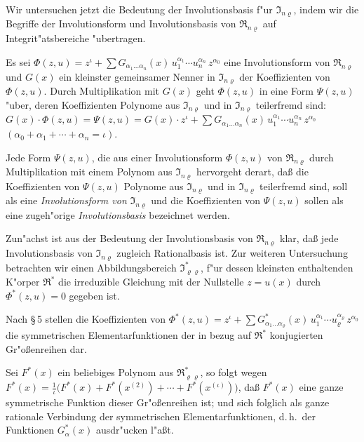 \documentclass[11pt,a4paper]{article}
\begin{document}
Wir untersuchen jetzt die Bedeutung der Involutionsbasis f"{u}r $\mathfrak{I}_{n\varrho}$,
indem wir die Begriffe der Involutionsform und Involutionsbasis von
$\mathfrak{R}_{n\varrho}$ auf Integrit"{a}tsbereiche "{u}bertragen.

Es sei
$\Phi(z,u)=z^{\iota}+\sum G_{\alpha_{1}\dots\alpha_{n}}(x)\,u_{1}^{\alpha_{1}}\cdots u_{n}^{\alpha_{n}}\,z^{\alpha_{0}}$
eine Involutionsform von $\mathfrak{R}_{n\varrho}$ und $G(x)$ ein kleinster gemeinsamer Nenner
in $\mathfrak{I}_{n\varrho}$ der Koeffizienten von $\Phi(z,u)$. Durch Multiplikation mit $G(x)$ geht
$\Phi(z,u)$ in eine Form $\Psi(z,u)$ "{u}ber, deren Koeffizienten Polynome aus
$\mathfrak{I}_{n\varrho}$ und in $\mathfrak{I}_{n\varrho}$ teilerfremd sind:
$G(x)\cdot\Phi(z,u)=\Psi(z,u)=G(x)\cdot z^{\iota}+\sum G_{\alpha_{1}\dots\alpha_{n}}(x)\,u_{1}^{\alpha_{1}}\cdots u_{n}^{\alpha_{n}}\,z^{\alpha_{0}}$
$(\alpha_{0}+\alpha_{1}+\cdots+\alpha_{n}=\iota)$.

Jede Form $\Psi(z,u)$, die aus einer Involutionsform $\Phi(z,u)$ von $\mathfrak{R}_{n\varrho}$
durch Multiplikation mit einem Polynom aus $\mathfrak{I}_{n\varrho}$ hervorgeht derart, da\ss{}
die Koeffizienten von $\Psi(z,u)$ Polynome aus $\mathfrak{I}_{n\varrho}$ und in $\mathfrak{I}_{n\varrho}$ teilerfremd sind,
soll als eine \emph{Involutionsform von} $\mathfrak{I}_{n\varrho}$ und die Koeffizienten von $\Psi(z,u)$
sollen als eine zugeh"{o}rige \emph{Involutionsbasis} bezeichnet werden.

Zun"{a}chst ist aus der Bedeutung der Involutionsbasis von $\mathfrak{R}_{n\varrho}$ klar,
da\ss{} jede Involutionsbasis von $\mathfrak{I}_{n\varrho}$ zugleich Rationalbasis ist. Zur weiteren
Untersuchung betrachten wir einen Abbildungsbereich $\mathfrak{I}_{\varrho\varrho}^{*}$, f"{u}r dessen
kleinsten enthaltenden K"{o}rper $\mathfrak{R}^{*}$ die irreduzible Gleichung mit der Nullstelle
$z=u(x)$ durch $\Phi^{*}(z,u)=0$ gegeben ist.

Nach \S\,5 stellen die Koeffizienten von
$\Phi^{*}(z,u)=z^{\iota}+\sum G_{\alpha_{1}\dots\alpha_{\varrho}}^{*}(x)\,u_{1}^{\alpha_{1}}\cdots u_{\varrho}^{\alpha_{\varrho}}\,z^{\alpha_{0}}$
die symmetrischen Elementarfunktionen der in bezug auf $\mathfrak{R}^{*}$ konjugierten
Gr"{o}\ss{}enreihen dar.

Sei $F^{*}(x)$ ein beliebiges Polynom aus $\mathfrak{R}_{\varrho\varrho}^{*}$, so folgt wegen
$F^{*}(x)=\frac{1}{\iota}\bigl(F^{*}(x)+F^{*}(x^{(2)})+\cdots+F^{*}(x^{(\iota)})\bigr)$,
da\ss{} $F^{*}(x)$ eine ganze symmetrische Funktion dieser Gr"{o}\ss{}enreihen ist;
und sich folglich als ganze rationale Verbindung der symmetrischen
Elementarfunktionen, d.\,h.\ der Funktionen $G_{\alpha}^{*}(x)$ ausdr"{u}cken l"{a}\ss{}t.
\end{document}
